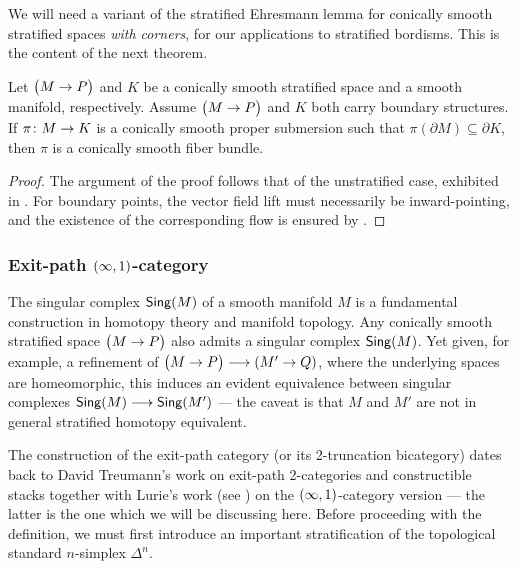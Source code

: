 \begin{remark}
    We will need a variant of the stratified Ehresmann lemma for conically smooth stratified spaces \emph{with corners}, for our applications to stratified bordisms. This is the content of the next theorem.
\end{remark}

\begin{cor}\label{ch4:: cor: stratified ehresmann boundary}
    Let $\big(M \rightarrow P\big)$ and $K$ be a conically smooth stratified space and a smooth manifold, respectively. Assume $\big(M \rightarrow P\big)$ and $K$ both carry boundary structures. If $\pi\colon M \rightarrow K$ is a conically smooth proper submersion such that $\pi(\partial M) \subseteq \partial K$, then $\pi$ is a conically smooth fiber bundle. 
\end{cor}
\begin{proof}
    The argument of the proof follows that of the unstratified case, exhibited in . For boundary points, the vector field lift must necessarily be inward-pointing, and the existence of the corresponding flow is ensured by .
\end{proof}




\subsubsection{Exit-path \texorpdfstring{$(\operatorname{\infty},1)$}{(infty,1)}-category}

The singular complex $\operatorname{\mathsf{Sing}}(M)$ of a smooth manifold $M$ is a fundamental construction in homotopy theory and manifold topology. Any conically smooth stratified space $\big(M \rightarrow P\big)$ also admits a singular complex $\operatorname{\mathsf{Sing}}(M)$. Yet given, for example, a refinement of $\big(M\rightarrow P\big) \longrightarrow (M' \rightarrow Q)$, where the underlying spaces are homeomorphic, this induces an evident equivalence between singular complexes $\operatorname{\mathsf{Sing}}(M)\longrightarrow \operatorname{\mathsf{Sing}}(M')$ — the caveat is that $M$ and $M'$ are not in general stratified homotopy equivalent.

The construction of the exit-path category (or its 2-truncation bicategory) dates back to David Treumann's work on exit-path 2-categories and constructible stacks \cite{Tre09} together with Lurie's work (see \cite{LurieHA}) on the $(\operatorname{\infty},1)$-category version — the latter is the one which we will be discussing here. Before proceeding with the definition, we must first introduce an important stratification of the topological standard $n$-simplex $\Delta^n$.

